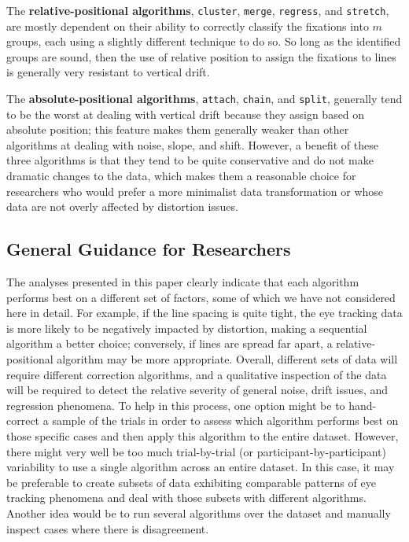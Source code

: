 \documentclass[doc,biblatex]{apa7}
\begin{document}
The \textbf{relative-positional algorithms}, \texttt{cluster}, \texttt{merge}, \texttt{regress}, and \texttt{stretch}, are mostly dependent on their ability to correctly classify the fixations into $m$ groups, each using a slightly different technique to do so. So long as the identified groups are sound, then the use of relative position to assign the fixations to lines is generally very resistant to vertical drift.

The \textbf{absolute-positional algorithms}, \texttt{attach}, \texttt{chain}, and \texttt{split}, generally tend to be the worst at dealing with vertical drift because they assign based on absolute position; this feature makes them generally weaker than other algorithms at dealing with noise, slope, and shift. However, a benefit of these three algorithms is that they tend to be quite conservative and do not make dramatic changes to the data, which makes them a reasonable choice for researchers who would prefer a more minimalist data transformation or whose data are not overly affected by distortion issues.

\subsection{General Guidance for Researchers}

The analyses presented in this paper clearly indicate that each algorithm performs best on a different set of factors, some of which we have not considered here in detail. For example, if the line spacing is quite tight, the eye tracking data is more likely to be negatively impacted by distortion, making a sequential algorithm a better choice; conversely, if lines are spread far apart, a relative-positional algorithm may be more appropriate. Overall, different sets of data will require different correction algorithms, and a qualitative inspection of the data will be required to detect the relative severity of general noise, drift issues, and regression phenomena. To help in this process, one option might be to hand-correct a sample of the trials in order to assess which algorithm performs best on those specific cases and then apply this algorithm to the entire dataset. However, there might very well be too much trial-by-trial (or participant-by-participant) variability to use a single algorithm across an entire dataset. In this case, it may be preferable to create subsets of data exhibiting comparable patterns of eye tracking phenomena and deal with those subsets with different algorithms. Another idea would be to run several algorithms over the dataset and manually inspect cases where there is disagreement.
\end{document}
